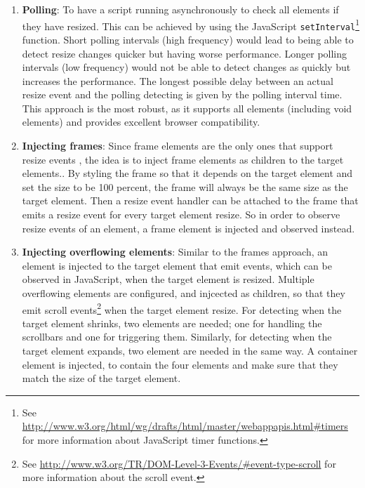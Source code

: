 \documentclass[a4paper,11pt]{kth-mag}
\newcommand{\code}[1]{\texttt{#1}}
\begin{document}
        \begin{enumerate}
          \item\label{itm:erd-approach-polling} \textbf{Polling}:
            To have a script running asynchronously to check all \glspl{element} if they have resized.
            This can be achieved by using the \gls{JavaScript} \code{setInterval}\footnote{See \url{http://www.w3.org/html/wg/drafts/html/master/webappapis.html\#timers} for more information about \gls{JavaScript} timer functions.} function.
            Short polling intervals (high frequency) would lead to being able to detect resize changes quicker but having worse performance.
            Longer polling intervals (low frequency) would not be able to detect changes as quickly but increases the performance.
            The longest possible delay between an actual resize event and the polling detecting is given by the polling interval time.
            This approach is the most robust, as it supports all elements (including void elements) and provides excellent browser compatibility.
          \item\label{itm:erd-approach-frame} \textbf{Injecting frames}:
            Since frame \glspl{element} are the only ones that support resize events , the idea is to inject frame \glspl{element} as children to the target \glspl{element}..
            By styling the frame so that it depends on the target \gls{element} and set the size to be 100 percent, the frame will always be the same size as the target element.
            Then a resize event handler can be attached to the frame that emits a resize event for every target \gls{element} resize.
            So in order to observe resize events of an element, a frame \gls{element} is injected and observed instead.
          \item\label{itm:erd-approach-scroll} \textbf{Injecting overflowing \glspl{element}}:
            Similar to the frames approach, an \gls{element} is injected to the target element that emit events, which can be observed in JavaScript, when the target element is resized.
            Multiple overflowing elements are configured, and injcected as children, so that they emit scroll events\footnote{See \url{http://www.w3.org/TR/DOM-Level-3-Events/\#event-type-scroll} for more information about the scroll event.} when the target element resize.
            For detecting when the target \gls{element} shrinks, two \glspl{element} are needed; one for handling the scrollbars and one for triggering them.
            Similarly, for detecting when the target \gls{element} expands, two \gls{element} are needed in the same way.
            A container \gls{element} is injected, to contain the four \glspl{element} and make sure that they match the size of the target element.
        \end{enumerate}
\end{document}
